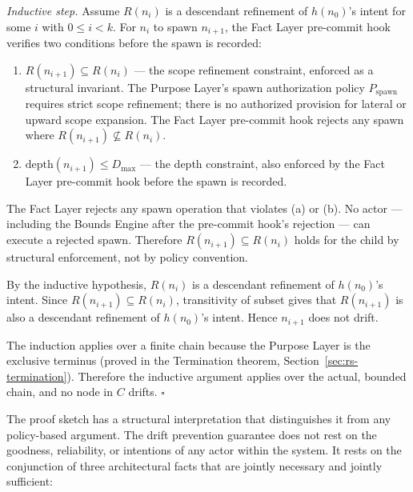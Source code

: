 \medskip
\textit{Inductive step.} Assume $R(n_i)$ is a descendant refinement of $h(n_0)$'s intent for some $i$ with $0 \leq i < k$. For $n_i$ to spawn $n_{i+1}$, the Fact Layer pre-commit hook verifies two conditions before the spawn is recorded:
\begin{enumerate}
    \item[(a)] $R(n_{i+1}) \subseteq R(n_i)$ — the scope refinement constraint, enforced as a structural invariant. The Purpose Layer's spawn authorization policy $P_{\mathrm{spawn}}$ requires strict scope refinement; there is no authorized provision for lateral or upward scope expansion. The Fact Layer pre-commit hook rejects any spawn where $R(n_{i+1}) \not\subseteq R(n_i)$.
    \item[(b)] $\mathrm{depth}(n_{i+1}) \leq D_{\mathrm{max}}$ — the depth constraint, also enforced by the Fact Layer pre-commit hook before the spawn is recorded.
\end{enumerate}

The Fact Layer rejects any spawn operation that violates (a) or (b). No actor — including the Bounds Engine after the pre-commit hook's rejection — can execute a rejected spawn. Therefore $R(n_{i+1}) \subseteq R(n_i)$ holds for the child by structural enforcement, not by policy convention.

By the inductive hypothesis, $R(n_i)$ is a descendant refinement of $h(n_0)$'s intent. Since $R(n_{i+1}) \subseteq R(n_i)$, transitivity of subset gives that $R(n_{i+1})$ is also a descendant refinement of $h(n_0)$'s intent. Hence $n_{i+1}$ does not drift.

The induction applies over a finite chain because the Purpose Layer is the exclusive terminus (proved in the Termination theorem, Section~\ref{sec:rs-termination}). Therefore the inductive argument applies over the actual, bounded chain, and no node in $C$ drifts. $\square$

\medskip
The proof sketch has a structural interpretation that distinguishes it from any policy-based argument. The drift prevention guarantee does not rest on the goodness, reliability, or intentions of any actor within the system. It rests on the conjunction of three architectural facts that are jointly necessary and jointly sufficient:

